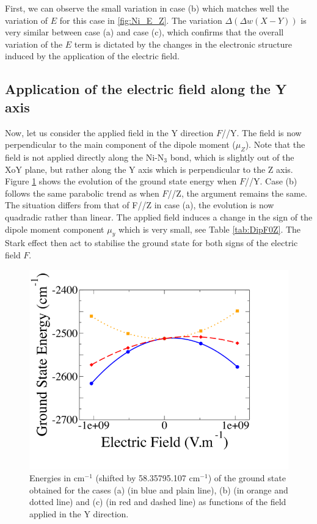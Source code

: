 \documentclass[10pt]{report}
\numberwithin{equation}{section}
\begin{document}
First, we can observe the small variation in case (b) which matches well the variation of $E$ for this case in \ref{fig:Ni_E_Z}.
The variation $\Delta (\Delta w(X-Y))$ is very similar between case (a) and case (c), which confirms that the overall variation of the $E$ term is dictated by the changes in the electronic structure induced by the application of the electric field.


\subsection{Application of the electric field along the Y axis}

Now, let us consider the applied field in the Y direction $F$//Y.
The field is now perpendicular to the main component of the dipole moment ($\mu_Z$).
Note that the field is not applied directly along the Ni-N$_3$ bond, which is slightly out of the XoY plane, but rather along the Y axis which is perpendicular to the Z axis.
Figure \ref{GSE_Y} shows the evolution of the ground state energy when $F$//Y.
Case (b) follows the same parabolic trend as when $F$//Z, the argument remains the same.
The situation differs from that of F//Z in case (a), the evolution is now quadradic rather than linear. 
The applied field induces a change in the sign of the dipole moment component $\mu_y$ which is very small, see Table \ref{tab:DipF0Z}.
The Stark effect then act to stabilise the ground state for both signs of the electric field $F$.


\begin{figure}[!ht]
    \centering
    \includegraphics[width=\textwidth]{Images/E_Y.png}
    \caption{Energies in cm$^{-1}$ (shifted by 58.35795.107 cm$^{-1}$) of the ground state obtained for the cases (a) (in blue and plain line), (b)
    (in orange and dotted line) and (c) (in red and dashed line) as functions of the field applied in the Y direction.}
    \label{GSE_Y}
\end{figure}
\end{document}
